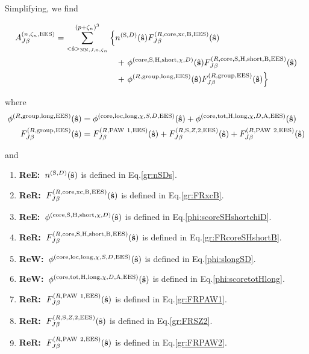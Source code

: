 \documentclass[paper=a4, fontsize=11pt]{article} %
\numberwithin{equation}{section} %
\numberwithin{figure}{section} %
\numberwithin{table}{section} %
\newcommand{\bs}{{\bf{s}}}
\newcommand{\hs}{{\hat{\bf{s}}}}
\newcommand{\rS}{{\mathrm{S}}}
\newcommand{\rEES}{{\mathrm{EES}}}
\newcommand{\rxc}{{\mathrm{xc}}}
\newcommand{\rgr}{{\mathrm{group}}}
\newcommand{\rcore}{{\mathrm{core}}}
\newcommand{\rNN}{{\mathrm{NN}}}
\newcommand{\rshort}{{\mathrm{short}}}
\newcommand{\rlong}{{\mathrm{long}}}
\newcommand{\rP}{{\mathrm{PAW}}}
\newcommand{\rH}{{\mathrm{H}}}
\newcommand{\rA}{{\mathrm{A}}}
\newcommand{\rB}{{\mathrm{B}}}
\newcommand{\rlo}{{\mathrm{loc}}}
\newcommand{\rtot}{{\mathrm{tot}}}
\newcommand{\pzn}{{(p+\zeta_n)^3}}
\newcommand{\hsJn}{{<\hs>_{\rNN,J,n,\zeta_n}}}
\newcommand{\ReE}{{{\bf ReE:\ }}}
\newcommand{\ReW}{{{\bf ReW:\ }}}
\newcommand{\ReR}{{{\bf ReR:\ }}}
\begin{document}
Simplifying, we find

\begin{equation}\label{gr:AJb4}
\begin{split}
A_{J\beta}^{(n,\zeta_n,\rEES)} &= 
 \sum_{\hsJn}^{\pzn} \left\{  n^{(\rS,D)}(\hat \bs) F_{J\beta}^{(R,\rcore,\rxc,\rB,\rEES)}(\hs) \right. \\
&\hspace*{1in}+ \left.   \phi^{(\rcore,\rS,\rH,\rshort,\chi,D)}(\hs)F_{J\beta}^{(R,\rcore,\rS,\rH,\rshort,\rB,\rEES)}(\hs) \right.\\
&\hspace*{1in}+ \left.  \phi^{(R,\rgr,\rlong,\rEES)}(\hs) F_{J\beta}^{(R,\rgr,\rEES)}(\hs) \right\} \\
\end{split}
\end{equation}

where
\begin{equation}
\begin{split}
\phi^{(R,\rgr,\rlong,\rEES)}(\hs) 
&=\phi^{(\rcore,\rlo,\rlong,\chi,S,D,\rEES)}(\hs)+ \phi^{(\rcore,\rtot,\rH,\rlong,\chi,D,\rA,\rEES)}(\hs) \\
F_{J\beta}^{(R,\rgr,\rEES)}(\hs)
&= F_{J\beta}^{(R,\rP\ 1,\rEES)}(\hs) + F_{J\beta}^{(R,\rS,Z,2,\rEES)}(\hs)+ F_{J\beta}^{(R,\rP\ 2,\rEES)}(\hs) \\
\end{split}
\end{equation}

and
\begin{enumerate}
\item \ReE $n^{(\rS,D)}(\hat \bs)$ is defined in Eq.\eqref{gr:nSDs}.
\item \ReR $F_{J\beta}^{(R,\rcore,\rxc,\rB,\rEES)}(\hs)$ is defined in Eq.\eqref{gr:FRxcB}.
\item \ReE $\phi^{(\rcore,\rS,\rH,\rshort,\chi,D)}(\hs)$ is defined in Eq.\eqref{phi:scoreSHshortchiD}.
\item \ReR $F_{J\beta}^{(R,\rcore,\rS,\rH,\rshort,\rB,\rEES)}(\hs)$ is defined in Eq.\eqref{gr:FRcoreSHshortB}.
\item \ReW $\phi^{(\rcore,\rlo,\rlong,\chi,S,D,\rEES)}(\hs)$ is defined in Eq.\eqref{phi:slongSD}.
\item \ReW $\phi^{(\rcore,\rtot,\rH,\rlong,\chi,D,\rA,\rEES)}(\hs)$ is defined in Eq.\eqref{phi:scoretotHlong}.
\item \ReR $F_{J\beta}^{(R,\rP\ 1,\rEES)}(\hs)$ is defined in Eq.\eqref{gr:FRPAW1}.
\item \ReR $F_{J\beta}^{(R,\rS,Z,2,\rEES)}(\hs)$ is defined in Eq.\eqref{gr:FRSZ2}.
\item \ReR $F_{J\beta}^{(R,\rP\ 2,\rEES)}(\hs)$ is defined in Eq.\eqref{gr:FRPAW2}.
\end{enumerate}
\end{document}
